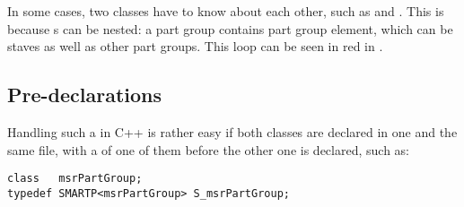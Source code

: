%
%
%


%
%
%
%
%



In some cases, two classes have to know about each other, such as  and . This is because s can be nested: a part group contains part group element, which can be staves as well as other part groups. This loop can be seen in red in .


\subsection{Pre-declarations}

Handling such a  in C++ is rather easy if both classes are declared in one and the same  file, with a  of one of them before the other one is declared, such as:
\begin{lstlisting}[language=CPlusPlus]
class   msrPartGroup;
typedef SMARTP<msrPartGroup> S_msrPartGroup;
\end{lstlisting}

